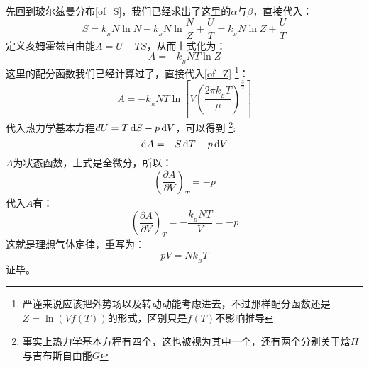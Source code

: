         \begin{prove}
            先回到玻尔兹曼分布\ref{of_S}，我们已经求出了这里的$\alpha$与$\beta$，直接代入：
            \begin{equation}
                S = k_{_B}N\ln N - k_{_B}N\ln\frac{N}{Z} + \frac{U}{T} = k_{_B}N\ln Z + \frac{U}{T}
            \end{equation}
            定义亥姆霍兹自由能$A=U-TS$，从而上式化为：
            \begin{equation}
                A = -k_{_B}NT\ln Z
            \end{equation}
            这里的配分函数我们已经计算过了，直接代入\ref{of_Z}
            \footnote{严谨来说应该把外势场以及转动动能考虑进去，不过那样配分函数还是$Z=\ln(Vf(T))$的形式，区别只是$f(T)$不影响推导}：
            \begin{equation}
                A = -k_{_B}NT\ln\left[V\left(\frac{2\pi k_{_B}T}{\mu}\right)^{\frac{3}{2}}\right]
                \label{of_A}
            \end{equation}
            代入热力学基本方程$dU=T\dif{S}-p\dif{V}$，可以得到
            \footnote{事实上热力学基本方程有四个，这也被视为其中一个，还有两个分别关于焓$H$与吉布斯自由能$G$}:
            \begin{equation}
                \dif{A} = -S\dif{T} - p\dif{V}
                \label{of_dif_A}
            \end{equation}
            $A$为状态函数，上式是全微分，所以：
            \begin{equation}
                \left(\frac{\partial A}{\partial V}\right)_{T} = -p
            \end{equation}
            代入$A$有：
            \begin{equation}
                \left(\frac{\partial A}{\partial V}\right)_{T} = -\frac{k_{_B}NT}{V} =-p
            \end{equation}
            这就是理想气体定律，重写为：
            \begin{equation}
                pV = Nk_{_B}T
            \end{equation}
            证毕。
        \end{prove}

